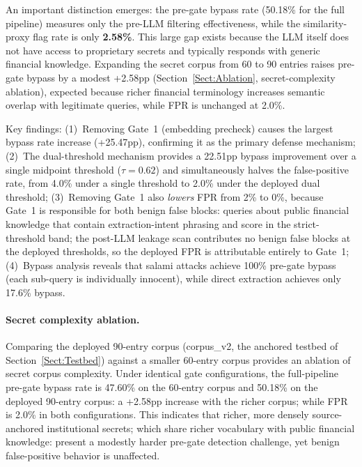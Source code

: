 \documentclass[journal]{IEEEtran}
\begin{document}
An important distinction emerges: the pre-gate bypass rate (50.18\% for the full pipeline) measures only the pre-LLM filtering effectiveness, while the similarity-proxy flag rate is only \textbf{2.58\%}. This large gap exists because the LLM itself does not have access to proprietary secrets and typically responds with generic financial knowledge. Expanding the secret corpus from 60 to 90 entries raises pre-gate bypass by a modest +2.58pp (Section~\ref{Sect:Ablation}, secret-complexity ablation), expected because richer financial terminology increases semantic overlap with legitimate queries, while FPR is unchanged at 2.0\%.

Key findings: (1)~Removing Gate~1 (embedding precheck) causes the largest bypass rate increase (+25.47pp), confirming it as the primary defense mechanism; (2)~The dual-threshold mechanism provides a 22.51pp bypass improvement over a single midpoint threshold ($\tau{=}0.62$) and simultaneously halves the false-positive rate, from 4.0\% under a single threshold to 2.0\% under the deployed dual threshold; (3)~Removing Gate~1 also \textit{lowers} FPR from 2\% to 0\%, because Gate~1 is responsible for both benign false blocks: queries about public financial knowledge that contain extraction-intent phrasing and score in the strict-threshold band; the post-LLM leakage scan contributes no benign false blocks at the deployed thresholds, so the deployed FPR is attributable entirely to Gate~1; (4)~Bypass analysis reveals that salami attacks achieve 100\% pre-gate bypass (each sub-query is individually innocent), while direct extraction achieves only 17.6\% bypass.

\paragraph{Secret complexity ablation.} Comparing the deployed 90-entry corpus (corpus\_v2, the anchored testbed of Section~\ref{Sect:Testbed}) against a smaller 60-entry corpus provides an ablation of secret corpus complexity. Under identical gate configurations, the full-pipeline pre-gate bypass rate is 47.60\% on the 60-entry corpus and 50.18\% on the deployed 90-entry corpus: a +2.58pp increase with the richer corpus; while FPR is 2.0\% in both configurations. This indicates that richer, more densely source-anchored institutional secrets; which share richer vocabulary with public financial knowledge: present a modestly harder pre-gate detection challenge, yet benign false-positive behavior is unaffected.
\end{document}
